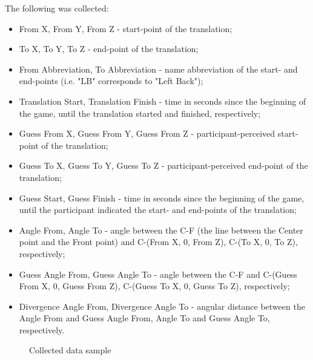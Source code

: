 The following was collected:
\begin{itemize}
	\item From X, From Y, From Z - start-point of the translation;
	\item To X, To Y, To Z - end-point of the translation;
	\item From Abbreviation, To Abbreviation - name abbreviation of the start- and end-points (i.e. "LB" corresponds to "Left Back");
	\item Translation Start, Translation Finish - time in seconds since the beginning of the game, until the translation started and finished, respectively;
	\item Guess From X, Guess From Y, Guess From Z - participant-perceived start-point of the translation;
	\item Guess To X, Guess To Y, Guess To Z - participant-perceived end-point of the translation;
	\item Guess Start, Guess Finish - time in seconds since the beginning of the game, until the participant indicated the start- and end-points of the translation;
	\item Angle From, Angle To - angle between the C-F (the line between the Center point and the Front point) and C-(From X, 0, From Z), C-(To X, 0, To Z), respectively;
	\item Guess Angle From, Guess Angle To - angle between the C-F and C-(Guess From X, 0, Guess From Z), C-(Guess To X, 0, Guess To Z), respectively;
	\item Divergence Angle From, Divergence Angle To - angular distance between the Angle From and Guess Angle From, Angle To and Guess Angle To, respectively.
\end{itemize}

\begin{figure}
	\centering
	\par
	\caption{Collected data sample}
	\label{fig:pilot2datasample}
\end{figure}



